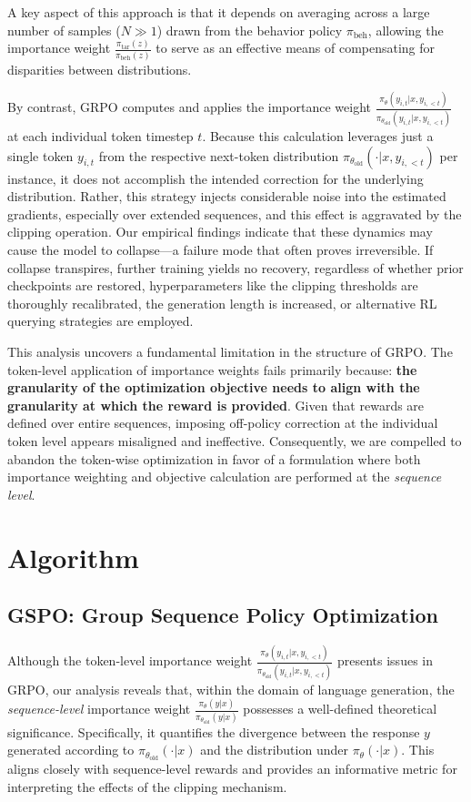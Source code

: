 A key aspect of this approach is that it depends on averaging across a large number of samples ($N \gg 1$) drawn from the behavior policy $\pi_\text{beh}$, allowing the importance weight $\frac{ \pi_\text{tar} (z) }{ \pi_\text{beh} (z)}$ to serve as an effective means of compensating for disparities between distributions.

By contrast, GRPO computes and applies the importance weight $\frac{ \pi_{\theta} (y_{i,t} | x, y_{i,<t}) }{ \pi_{\theta_\text{old}} (y_{i,t} | x,y_{i,<t})}$ at each individual token timestep $t$. Because this calculation leverages just a single token $y_{i,t}$ from the respective next-token distribution $\pi_{\theta_\text{old}}( \cdot | x, y_{i, <t})$ per instance, it does not accomplish the intended correction for the underlying distribution. Rather, this strategy injects considerable noise into the estimated gradients, especially over extended sequences, and this effect is aggravated by the clipping operation. Our empirical findings indicate that these dynamics may cause the model to collapse—a failure mode that often proves irreversible. If collapse transpires, further training yields no recovery, regardless of whether prior checkpoints are restored, hyperparameters like the clipping thresholds are thoroughly recalibrated, the generation length is increased, or alternative RL querying strategies are employed.

This analysis uncovers a fundamental limitation in the structure of GRPO. The token-level application of importance weights fails primarily because: \textbf{the granularity of the optimization objective needs to align with the granularity at which the reward is provided}. Given that rewards are defined over entire sequences, imposing off-policy correction at the individual token level appears misaligned and ineffective. Consequently, we are compelled to abandon the token-wise optimization in favor of a formulation where both importance weighting and objective calculation are performed at the \textit{sequence level}.

\section{Algorithm}

\subsection{GSPO: Group Sequence Policy Optimization}

Although the token-level importance weight $\frac{ \pi_{\theta} (y_{i,t} | x, y_{i,<t}) }{ \pi_{\theta_\text{old}} (y_{i,t} | x,y_{i,<t})}$ presents issues in GRPO, our analysis reveals that, within the domain of language generation, the \textit{sequence-level} importance weight $\frac{ \pi_{\theta} (y | x) }{ \pi_{\theta_\text{old}} (y | x)}$ possesses a well-defined theoretical significance. Specifically, it quantifies the divergence between the response $y$ generated according to $\pi_{\theta_\text{old}} (\cdot | x)$ and the distribution under $\pi_{\theta} (\cdot | x)$. This aligns closely with sequence-level rewards and provides an informative metric for interpreting the effects of the clipping mechanism.

